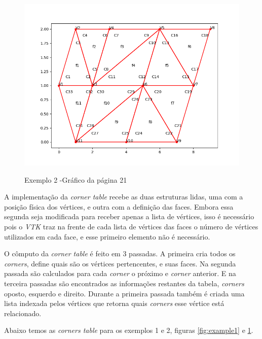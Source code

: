 \documentclass[a4paper]{article}
\begin{document}
 
 \begin{figure}[ht]
	\centering
	\includegraphics[width=1.0\textwidth]{example2.png}
	\label{fig:example2} 
	\caption[caption]{Exemplo 2 -Gráfico da página 21}
\end{figure}
 
 
 
 A implementação da \textit{corner table} recebe as duas estruturas lidas, uma com a posição física dos vértices, e outra com a definição das faces. Embora essa segunda seja modificada para receber apenas a lista de vértices, isso é necessário pois o \textit{VTK} traz na frente de cada lista de vértices das faces o número de vértices utilizados em cada face, e esse primeiro elemento não é necessário.
 
 O cômputo da \textit{corner table} é feito em 3 passadas. A primeira cria todos os \textit{corners}, define quais são os vértices pertencentes, e suas faces. Na segunda passada são calculados para cada \textit{corner} o próximo e \textit{corner} anterior. E na terceira passadas são encontrados as informações restantes da tabela, \textit{corners} oposto, esquerdo e direito. Durante a primeira passada também é criada uma lista indexada pelos vértices que retorna quais \textit{corners} esse vértice está relacionado.
 
 Abaixo temos as \textit{corners table} para os exemplos 1 e 2, figuras \ref{fig:example1} e \ref{fig:example2}.
 
\end{document}
